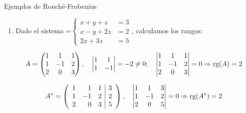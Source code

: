 \documentclass[11pt,a4paper]{article}
\newcommand{\fmm}[1]{\setbox0=\hbox{$#1$}\ifdim\wd0>\linewidth\fmdisp{#1}\else\mbox{\box0}\fi}
\newcommand{\fmdisp}[1]{\[\setbox2=\hbox{$\displaystyle #1$}\ifdim\wd2>\linewidth\resizebox{\linewidth}{!}{\box2}\else\box2\fi\]}
\newcommand{\fmbadge}[2]{\tcbox[on line,colback=#1,colframe=#1,arc=2mm,boxsep=0pt,left=4pt,right=4pt,top=1.5pt,bottom=1.5pt]{\color{white}\footnotesize\bfseries #2}}
\begin{document}
\begin{fmex}{Ejemplos de Rouché-Frobenius}
\begin{enumerate}[label=\textbf{\arabic*.},leftmargin=*]
Como \fmm{\operatorname{rg}(A)=\operatorname{rg}(A^*)=2=} n.º de incógnitas, el sistema es \fmbadge{fmok}{SCD}. Para resolverlo, eliminamos la tercera ecuación (no forma parte del menor que da el rango) y aplicamos Cramer:

\fmdisp{\left\{\begin{aligned}2x-y&=1\\ x+y&=2\end{aligned}\right.\Rightarrow x=\frac{\begin{vmatrix}1 & -1\\ 2 & 1\end{vmatrix}}{\begin{vmatrix}2 & -1\\ 1 & 1\end{vmatrix}}=\frac{3}{3}=1\qquad y=\frac{\begin{vmatrix}2 & 1\\ 1 & 2\end{vmatrix}}{\begin{vmatrix}2 & -1\\ 1 & 1\end{vmatrix}}=\frac{3}{3}=1\qquad\boxed{x=1;\ y=1}}

\item Dado el sistema \fmm{\left\{\begin{aligned}x+y+z&=3\\ x-y+2z&=2\\ 2x+3z&=5\end{aligned}\right.}, calculamos los rangos:

\fmdisp{A=\begin{pmatrix}1 & 1 & 1\\ 1 & -1 & 2\\ 2 & 0 & 3\end{pmatrix},\quad\begin{vmatrix}1 & 1\\ 1 & -1\end{vmatrix}=-2\neq0;\quad\begin{vmatrix}1 & 1 & 1\\ 1 & -1 & 2\\ 2 & 0 & 3\end{vmatrix}=0\Rightarrow\operatorname{rg}(A)=2}

\fmdisp{A^*=\left(\begin{array}{rrr|r}1 & 1 & 1 & 3\\ 1 & -1 & 2 & 2\\ 2 & 0 & 3 & 5\end{array}\right),\quad\begin{vmatrix}1 & 1 & 3\\ 1 & -1 & 2\\ 2 & 0 & 5\end{vmatrix}=0\Rightarrow\operatorname{rg}(A^*)=2}


\end{enumerate}
\end{fmex}
\end{document}
